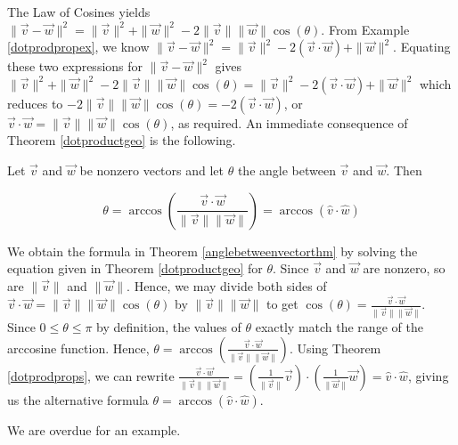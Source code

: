 The Law of Cosines yields $\| \vec{v} - \vec{w} \|^2 = \|\vec{v}\|^2 + \|\vec{w}\|^2 - 2\|\vec{v}\| \|\vec{w}\| \cos(\theta)$.  From Example \ref{dotprodpropex}, we know $\|\vec{v} - \vec{w}\|^2 = \|\vec{v}\|^2  -2 (\vec{v} \cdot \vec{w}) + \|\vec{w}\|^2$.  Equating these two expressions for $\| \vec{v} - \vec{w} \|^2$ gives $\|\vec{v}\|^2 + \|\vec{w}\|^2 - 2\|\vec{v}\| \|\vec{w}\| \cos(\theta)  =  \|\vec{v}\|^2  -2 (\vec{v} \cdot \vec{w}) + \|\vec{w}\|^2$ which reduces to $- 2\|\vec{v}\| \|\vec{w}\| \cos(\theta) =   -2 (\vec{v} \cdot \vec{w})$, or $\vec{v} \cdot \vec{w} = \|\vec{v}\| \|\vec{w}\| \cos(\theta)$, as required. An immediate consequence of Theorem \ref{dotproductgeo} is the following.

\smallskip

\colorbox{ResultColor}{\bbm

\begin{thm} \label{anglebetweenvectorthm} Let $\vec{v}$ and $\vec{w}$ be nonzero vectors and let $\theta$ the angle between $\vec{v}$ and $\vec{w}$.  Then  

\[ \theta = \arccos\left( \dfrac{\vec{v} \cdot \vec{w}}{\| \vec{v} \| \|\vec{w} \|}\right) = \arccos(\hat{v} \cdot \hat{w}) \]

\end{thm}

\ebm}

\smallskip

We obtain the formula in Theorem \ref{anglebetweenvectorthm} by solving the equation given in Theorem \ref{dotproductgeo} for $\theta$.  Since $\vec{v}$ and $\vec{w}$ are nonzero, so are $\| \vec{v} \|$ and $\|\vec{w}\|$.  Hence, we may divide both sides of $\vec{v} \cdot \vec{w} = \| \vec{v} \| \|\vec{w} \| \cos(\theta)$ by $\| \vec{v} \| \|\vec{w} \|$ to get $\cos(\theta) = \frac{\vec{v} \cdot \vec{w}}{\| \vec{v} \| \|\vec{w} \|}$.  Since $0 \leq \theta \leq \pi$ by definition, the values of $\theta$ exactly match the range of the arccosine function.  Hence, $\theta = \arccos\left( \frac{\vec{v} \cdot \vec{w}}{\| \vec{v} \| \|\vec{w} \|}\right)$.  Using Theorem \ref{dotprodprops}, we can rewrite $ \frac{\vec{v} \cdot \vec{w}}{\| \vec{v} \| \|\vec{w} \|} = \left(\frac{1}{\|\vec{v}\|} \vec{v}\right) \cdot \left(\frac{1}{\|\vec{w}\|} \vec{w}\right) = \hat{v} \cdot \hat{w}$, giving us the alternative formula $\theta = \arccos(\hat{v} \cdot \hat{w})$.  

\medskip

We are overdue for an example.

